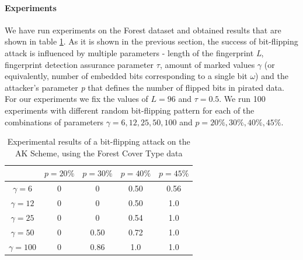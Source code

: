 \paragraph{Experiments}
We have run experiments on the Forest dataset and obtained results that are shown in table \ref{table:bit-flipping-ak-emp}. 
As it is shown in the previous section, the success of bit-flipping attack is influenced by multiple parameters - length of the fingerprint \textit{L}, fingerprint detection assurance parameter $\tau$, amount of marked values $\gamma$ (or equivalently, number of embedded bits corresponding to a single bit $\omega$) and the attacker's parameter \textit{p} that defines the number of flipped bits in pirated data. 
For our experiments we fix the values of $L=96$ and $\tau=0.5$.
We run 100 experiments with different random bit-flipping pattern for each of the combinations of parameters $\gamma = {6,12,25,50,100}$ and $p={20\%,30\%,40\%,45\%}$.

\begin{table}[ht]
\centering
\caption{Experimental results of a bit-flipping attack on the AK Scheme, using the Forest Cover Type data}
\begin{tabular}{|c|c|c|c|c|} 
 \hline
 & \textbf{$p=20\%$} & \textbf{$p=30\%$} & \textbf{$p=40\%$} & \textbf{$p=45\%$} \\
 \hline
 $\gamma=6$ & 0 & 0 & 0.50 & 0.56  \\
 \hline
 $\gamma=12$ & 0  & 0 & 0.50 & 1.0 \\ 
 \hline
 $\gamma=25$ & 0  & 0 & 0.54 & 1.0  \\
 \hline
 $\gamma=50$ & 0 & 0.50 & 0.72 & 1.0   \\
 \hline
  $\gamma=100$ & 0 & 0.86 & 1.0 & 1.0  \\
 \hline
\end{tabular}
\label{table:bit-flipping-ak-emp}
\end{table}

